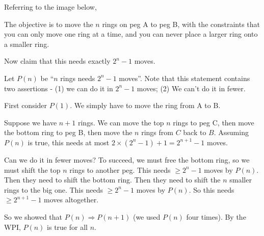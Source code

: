 \documentclass[a4paper]{article}
\begin{document}
  \begin{eg}
    Referring to the image below,

    \begin{center}
      \usetikzlibrary{shapes}
    \end{center}

    The objective is to move the $n$ rings on peg A to peg B, with the constraints that you can only move one ring at a time, and you can never place a larger ring onto a smaller ring.

    Now claim that this needs exactly $2^n - 1$ moves.

    Let $P(n)$ be ``$n$ rings needs $2^n - 1$ moves''. Note that this statement contains two assertions - (1) we can do it in $2^n - 1$ moves; (2) We can't do it in fewer.

    First consider $P(1)$. We simply have to move the ring from A to B.

    Suppose we have $n + 1$ rings. We can move the top $n$ rings to peg C, then move the bottom ring to peg B, then move the $n$ rings from $C$ back to $B$. Assuming $P(n)$ is true, this needs at most $2\times (2^n - 1) + 1 = 2^{n + 1} -1 $ moves.

    Can we do it in fewer moves? To succeed, we must free the bottom ring, so we must shift the top $n$ rings to another peg. This needs $\geq 2^n - 1$ moves by $P(n)$. Then they need to shift the bottom ring. Then they need to shift the $n$ smaller rings to the big one. This needs $\geq 2^n - 1$ moves by $P(n)$. So this needs $\geq 2^{n + 1} - 1$ moves altogether.

    So we showed that $P(n)\Rightarrow P(n + 1)$ (we used $P(n)$ four times). By the WPI, $P(n)$ is true for all $n$.
  \end{eg}
\end{document}
